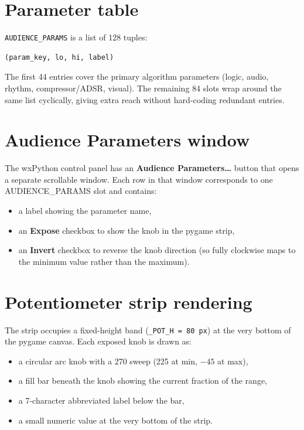 \documentclass[11pt,a4paper]{report}
\begin{document}
\section{Parameter table}

\texttt{AUDIENCE\_PARAMS} is a list of 128 tuples:

\begin{lstlisting}[style=code]
(param_key, lo, hi, label)
\end{lstlisting}

The first 44 entries cover the primary algorithm parameters (logic, audio,
rhythm, compressor/ADSR, visual).  The remaining 84 slots wrap around the
same list cyclically, giving extra reach without hard-coding redundant entries.

\section{Audience Parameters window}

The wxPython control panel has an \textbf{Audience Parameters\ldots} button
that opens a separate scrollable window.  Each row in that window corresponds
to one AUDIENCE\_PARAMS slot and contains:

\begin{itemize}
  \item a label showing the parameter name,
  \item an \textbf{Expose} checkbox to show the knob in the pygame strip,
  \item an \textbf{Invert} checkbox to reverse the knob direction (so fully
        clockwise maps to the minimum value rather than the maximum).
\end{itemize}

\section{Potentiometer strip rendering}

The strip occupies a fixed-height band (\texttt{\_POT\_H = 80\,px}) at the
very bottom of the pygame canvas.  Each exposed knob is drawn as:

\begin{itemize}
  \item a circular arc knob with a 270\textdegree{} sweep (225\textdegree{}
        at min, $-45$\textdegree{} at max),
  \item a fill bar beneath the knob showing the current fraction of the range,
  \item a 7-character abbreviated label below the bar,
  \item a small numeric value at the very bottom of the strip.
\end{itemize}
\end{document}
